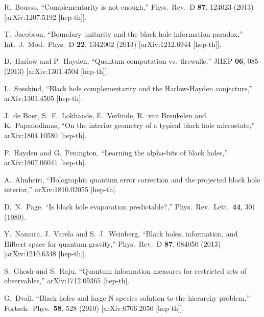 \documentclass[12pt]{article}
\begin{document}
\begin{thebibliography}{99}
R.~Bousso,
``Complementarity is not enough,''
Phys.\ Rev.\ D {\bf 87}, 124023 (2013)
[arXiv:1207.5192 [hep-th]].

T.~Jacobson,
``Boundary unitarity and the black hole information paradox,''
Int.\ J.\ Mod.\ Phys.\ D {\bf 22}, 1342002 (2013)
[arXiv:1212.6944 [hep-th]].

D.~Harlow and P.~Hayden,
``Quantum computation vs.\ firewalls,''
JHEP {\bf 06}, 085 (2013)
[arXiv:1301.4504 [hep-th]].

L.~Susskind,
``Black hole complementarity and the Harlow-Hayden conjecture,''
arXiv:1301.4505 [hep-th].

J.~de Boer, S.~F.~Lokhande, E.~Verlinde, R.~van Breukelen and K.~Papadodimas,
``On the interior geometry of a typical black hole microstate,''
arXiv:1804.10580 [hep-th].

P.~Hayden and G.~Penington,
``Learning the alpha-bits of black holes,''
arXiv:1807.06041 [hep-th].

A.~Almheiri,
``Holographic quantum error correction and the projected black hole interior,''
arXiv:1810.02055 [hep-th].

D.~N.~Page,
``Is black hole evaporation predictable?,''
Phys.\ Rev.\ Lett.\ {\bf 44}, 301 (1980).

Y.~Nomura, J.~Varela and S.~J.~Weinberg,
``Black holes, information, and Hilbert space for quantum gravity,''
Phys.\ Rev.\ D {\bf 87}, 084050 (2013)
[arXiv:1210.6348 [hep-th]].

S.~Ghosh and S.~Raju,
``Quantum information measures for restricted sets of observables,''
arXiv:1712.09365 [hep-th].

G.~Dvali,
``Black holes and large N species solution to the hierarchy problem,''
Fortsch.\ Phys.\ {\bf 58}, 528 (2010)
[arXiv:0706.2050 [hep-th]].


\end{thebibliography}
\end{document}
